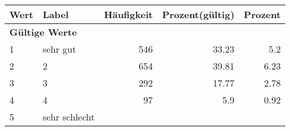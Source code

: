      \begin{longtable}{lXrrr}
     \toprule
     \textbf{Wert} & \textbf{Label} & \textbf{Häufigkeit} & \textbf{Prozent(gültig)} & \textbf{Prozent} \\
     \endhead
     \midrule
     \multicolumn{5}{l}{\textbf{Gültige Werte}}\\

     1 &
     \multicolumn{1}{X}{ sehr gut   } &


       \num{546} &
       \num[round-mode=places,round-precision=2]{33,23} &
         \num[round-mode=places,round-precision=2]{5,2} \\

     2 &
     \multicolumn{1}{X}{ 2   } &


       \num{654} &
       \num[round-mode=places,round-precision=2]{39,81} &
         \num[round-mode=places,round-precision=2]{6,23} \\

     3 &
     \multicolumn{1}{X}{ 3   } &


       \num{292} &
       \num[round-mode=places,round-precision=2]{17,77} &
         \num[round-mode=places,round-precision=2]{2,78} \\

     4 &
     \multicolumn{1}{X}{ 4   } &


       \num{97} &
       \num[round-mode=places,round-precision=2]{5,9} &
         \num[round-mode=places,round-precision=2]{0,92} \\

     5 &
     \multicolumn{1}{X}{ sehr schlecht   } &



\end{longtable}
